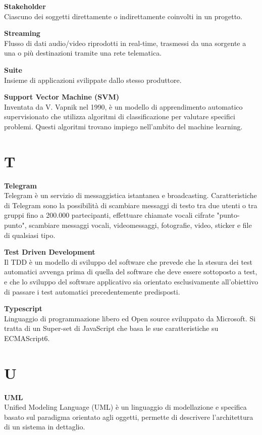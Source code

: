 \documentclass[a4paper, oneside, openany, dvipsnames, table, 12pt]{article}
\begin{document}
\textbf{Stakeholder} \\
Ciascuno dei soggetti direttamente o indirettamente coinvolti in un progetto.

\textbf{Streaming} \\
Flusso di dati audio/video riprodotti in real-time, trasmessi da una sorgente a una o più destinazioni tramite una rete telematica.

\textbf{Suite} \\
Insieme di applicazioni svilippate dallo stesso produttore.

\textbf{Support Vector Machine (SVM)} \\
Inventata da V. Vapnik nel 1990, è un modello di apprendimento automatico supervisionato che utilizza algoritmi di classificazione per valutare specifici problemi. Questi algoritmi trovano impiego nell'ambito del machine learning.

\newpage
\section{T}
\textbf{Telegram} \\
Telegram è un servizio di messaggistica istantanea e broadcasting. Caratteristiche di Telegram sono la possibilità di scambiare messaggi di testo tra due utenti o tra gruppi fino a 200.000 partecipanti, effettuare chiamate vocali cifrate "punto-punto", scambiare messaggi vocali, videomessaggi, fotografie, video, sticker e file di qualsiasi tipo.

\label{par:tdd}
\textbf{Test Driven Development} \\
Il TDD è un modello di sviluppo del software che prevede che la stesura dei test automatici avvenga prima di quella del software che deve essere sottoposto a test, e che lo sviluppo del software applicativo sia orientato esclusivamente all'obiettivo di passare i test automatici precedentemente predisposti.

\textbf{Typescript} \\
Linguaggio di programmazione libero ed Open source sviluppato da Microsoft. Si tratta di un Super-set di JavaScript che basa le sue caratteristiche su ECMAScript6.

\newpage
\section{U}
\textbf{UML} \\
Unified Modeling Language (UML) è un linguaggio di modellazione e specifica basato sul paradigma orientato agli oggetti, permette di descrivere l’architettura di un sistema in dettaglio. 
\end{document}
